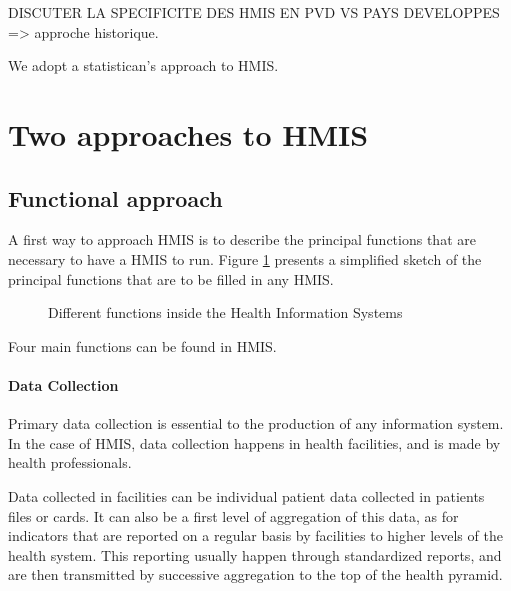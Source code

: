 \documentclass[a4paper,11pt,final,twoside]{article}
\begin{document}
DISCUTER LA SPECIFICITE DES HMIS EN PVD VS PAYS DEVELOPPES  => approche historique.

We adopt a statistican's approach to HMIS. 


\section{Two approaches to HMIS}

	\subsection{Functional approach}
	
A first way to approach HMIS is to describe the principal functions that are necessary to have a HMIS to run. Figure \ref{HMISFunctions} presents a simplified sketch of the principal functions that are to be filled in any HMIS. 

\begin{figure}[h]
\begin{center}
\end{center}
\caption{Different functions inside the Health Information Systems}
\label{HMISFunctions}
\end{figure}           

Four main functions can be found in HMIS. 

\paragraph{Data Collection} Primary data collection is essential to the production of any information system. In the case of HMIS, data collection happens in health facilities, and is made by health professionals.

Data collected in facilities can be individual patient data collected in patients files or cards. It can also be a first level of aggregation of this data, as for indicators that are reported on a regular basis by facilities to higher levels of the health system. This reporting usually happen through standardized reports, and are then transmitted by successive aggregation to the top of the health pyramid.
\end{document}
